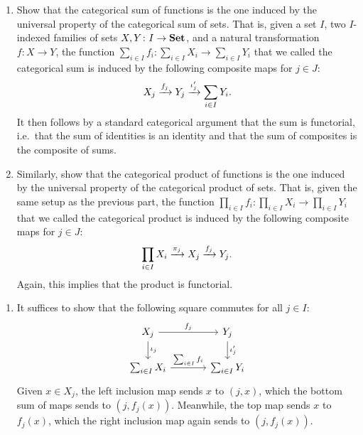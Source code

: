 \documentclass[Book-Poly]{subfiles}
\begin{document}
\begin{exercise}
    \begin{enumerate}
        \item Show that the categorical sum of functions is the one induced by the universal property of the categorical sum of sets.
        That is, given a set $I$, two $I$-indexed families of sets $X,Y\colon I\to\mathbf{Set}$, and a natural transformation $f\colon X\to Y$, the function $\sum_{i\in I}f_i\colon\sum_{i\in I}X_i\to\sum_{i\in I}Y_i$ that we called the categorical sum is induced by the following composite maps for $j\in J$:
        \[
        X_j\xrightarrow{f_j}Y_j\xrightarrow{\iota'_j}\sum_{i\in I}Y_i.
        \]
        It then follows by a standard categorical argument that the sum is functorial, i.e.\ that the sum of identities is an identity and that the sum of composites is the composite of sums.

        \item Similarly, show that the categorical product of functions is the one induced by the universal property of the categorical product of sets.
        That is, given the same setup as the previous part, the function $\prod_{i\in I}f_i\colon\prod_{i\in I}X_i\to\prod_{i\in I}Y_i$ that we called the categorical product is induced by the following composite maps for $j\in J$:
        \[
        \prod_{i\in I}X_i\xrightarrow{\pi_j}X_j\xrightarrow{f_j}Y_j.
        \]
        Again, this implies that the product is functorial. \qedhere
    \end{enumerate}
    \begin{solution}
        \begin{enumerate}
            \item It suffices to show that the following square commutes for all $j\in I$:
            \[
            \begin{tikzcd}[column sep=large]
                X_j \ar[d, "\iota_j"] \ar[r, "f_j"] & Y_j \ar[d, "\iota'_j"] \\
                \sum_{i\in I}X_i \ar[r, "\sum_{i\in I}f_i"] & \sum_{i\in I}Y_i
            \end{tikzcd}
            \]
            Given $x\in X_j$, the left inclusion map sends $x$ to $(j,x)$, which the bottom sum of maps sends to $(j,f_j(x))$.
            Meanwhile, the top map sends $x$ to $f_j(x)$, which the right inclusion map again sends to $(j,f_j(x))$.


\end{enumerate}
\end{solution}
\end{exercise}
\end{document}
